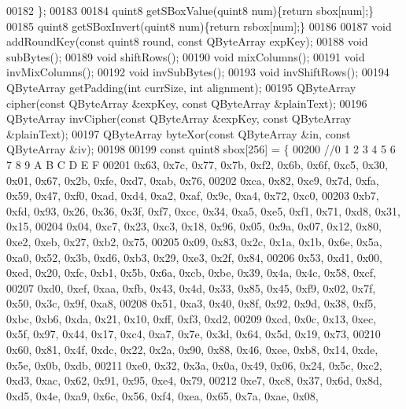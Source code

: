 \begin{DoxyCode}
00182     \};
00183 
00184     quint8 getSBoxValue(quint8 num)\{\textcolor{keywordflow}{return} sbox[num];\}
00185     quint8 getSBoxInvert(quint8 num)\{\textcolor{keywordflow}{return} rsbox[num];\}
00186 
00187     \textcolor{keywordtype}{void} addRoundKey(\textcolor{keyword}{const} quint8 round, \textcolor{keyword}{const} QByteArray expKey);
00188     \textcolor{keywordtype}{void} subBytes();
00189     \textcolor{keywordtype}{void} shiftRows();
00190     \textcolor{keywordtype}{void} mixColumns();
00191     \textcolor{keywordtype}{void} invMixColumns();
00192     \textcolor{keywordtype}{void} invSubBytes();
00193     \textcolor{keywordtype}{void} invShiftRows();
00194     QByteArray getPadding(\textcolor{keywordtype}{int} currSize, \textcolor{keywordtype}{int} alignment);
00195     QByteArray cipher(\textcolor{keyword}{const} QByteArray &expKey, \textcolor{keyword}{const} QByteArray &plainText);
00196     QByteArray invCipher(\textcolor{keyword}{const} QByteArray &expKey, \textcolor{keyword}{const} QByteArray &plainText);
00197     QByteArray byteXor(\textcolor{keyword}{const} QByteArray &in, \textcolor{keyword}{const} QByteArray &iv);
00198 
00199     \textcolor{keyword}{const} quint8 sbox[256] =   \{
00200       \textcolor{comment}{//0     1    2      3     4    5     6     7      8    9     A      B    C     D     E     F}
00201       0x63, 0x7c, 0x77, 0x7b, 0xf2, 0x6b, 0x6f, 0xc5, 0x30, 0x01, 0x67, 0x2b, 0xfe, 0xd7, 0xab, 0x76,
00202       0xca, 0x82, 0xc9, 0x7d, 0xfa, 0x59, 0x47, 0xf0, 0xad, 0xd4, 0xa2, 0xaf, 0x9c, 0xa4, 0x72, 0xc0,
00203       0xb7, 0xfd, 0x93, 0x26, 0x36, 0x3f, 0xf7, 0xcc, 0x34, 0xa5, 0xe5, 0xf1, 0x71, 0xd8, 0x31, 0x15,
00204       0x04, 0xc7, 0x23, 0xc3, 0x18, 0x96, 0x05, 0x9a, 0x07, 0x12, 0x80, 0xe2, 0xeb, 0x27, 0xb2, 0x75,
00205       0x09, 0x83, 0x2c, 0x1a, 0x1b, 0x6e, 0x5a, 0xa0, 0x52, 0x3b, 0xd6, 0xb3, 0x29, 0xe3, 0x2f, 0x84,
00206       0x53, 0xd1, 0x00, 0xed, 0x20, 0xfc, 0xb1, 0x5b, 0x6a, 0xcb, 0xbe, 0x39, 0x4a, 0x4c, 0x58, 0xcf,
00207       0xd0, 0xef, 0xaa, 0xfb, 0x43, 0x4d, 0x33, 0x85, 0x45, 0xf9, 0x02, 0x7f, 0x50, 0x3c, 0x9f, 0xa8,
00208       0x51, 0xa3, 0x40, 0x8f, 0x92, 0x9d, 0x38, 0xf5, 0xbc, 0xb6, 0xda, 0x21, 0x10, 0xff, 0xf3, 0xd2,
00209       0xcd, 0x0c, 0x13, 0xec, 0x5f, 0x97, 0x44, 0x17, 0xc4, 0xa7, 0x7e, 0x3d, 0x64, 0x5d, 0x19, 0x73,
00210       0x60, 0x81, 0x4f, 0xdc, 0x22, 0x2a, 0x90, 0x88, 0x46, 0xee, 0xb8, 0x14, 0xde, 0x5e, 0x0b, 0xdb,
00211       0xe0, 0x32, 0x3a, 0x0a, 0x49, 0x06, 0x24, 0x5c, 0xc2, 0xd3, 0xac, 0x62, 0x91, 0x95, 0xe4, 0x79,
00212       0xe7, 0xc8, 0x37, 0x6d, 0x8d, 0xd5, 0x4e, 0xa9, 0x6c, 0x56, 0xf4, 0xea, 0x65, 0x7a, 0xae, 0x08,

\end{DoxyCode}
